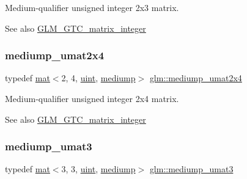 Medium-\/qualifier unsigned integer 2x3 matrix. \begin{DoxySeeAlso}{See also}
\hyperlink{group__gtc__matrix__integer}{G\+L\+M\+\_\+\+G\+T\+C\+\_\+matrix\+\_\+integer} 
\end{DoxySeeAlso}
\mbox{\label{group__gtc__matrix__integer_gae060f3b73abab278da912329a0a221bc}} 
\subsubsection{\texorpdfstring{mediump\+\_\+umat2x4}{mediump\_umat2x4}}
{\footnotesize\ttfamily typedef \hyperlink{structglm_1_1mat}{mat}$<$2, 4, \hyperlink{group__core__precision_ga4fd29415871152bfb5abd588334147c8}{uint}, \hyperlink{namespaceglm_a36ed105b07c7746804d7fdc7cc90ff25a6416f3ea0c9025fb21ed50c4d6620482}{mediump}$>$ \hyperlink{group__gtc__matrix__integer_gae060f3b73abab278da912329a0a221bc}{glm\+::mediump\+\_\+umat2x4}}

Medium-\/qualifier unsigned integer 2x4 matrix. \begin{DoxySeeAlso}{See also}
\hyperlink{group__gtc__matrix__integer}{G\+L\+M\+\_\+\+G\+T\+C\+\_\+matrix\+\_\+integer} 
\end{DoxySeeAlso}
\mbox{\label{group__gtc__matrix__integer_gaa677ebd95702fc95054de7a4fb4c907f}} 
\subsubsection{\texorpdfstring{mediump\+\_\+umat3}{mediump\_umat3}}
{\footnotesize\ttfamily typedef \hyperlink{structglm_1_1mat}{mat}$<$3, 3, \hyperlink{group__core__precision_ga4fd29415871152bfb5abd588334147c8}{uint}, \hyperlink{namespaceglm_a36ed105b07c7746804d7fdc7cc90ff25a6416f3ea0c9025fb21ed50c4d6620482}{mediump}$>$ \hyperlink{group__gtc__matrix__integer_gaa677ebd95702fc95054de7a4fb4c907f}{glm\+::mediump\+\_\+umat3}}

